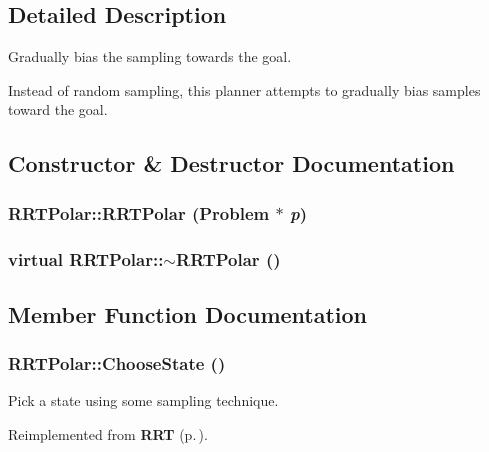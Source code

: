 \subsection{Detailed Description}
Gradually bias the sampling towards the goal.

Instead of random sampling, this planner attempts to gradually bias  samples toward the goal. 



\subsection{Constructor \& Destructor Documentation}
\subsubsection{\setlength{\rightskip}{0pt plus 5cm}RRTPolar::RRTPolar ({\bf Problem} $\ast$ {\em p})}\label{classRRTPolar_a0}


\subsubsection{\setlength{\rightskip}{0pt plus 5cm}virtual RRTPolar::$\sim$RRTPolar ()\hspace{0.3cm}{\tt  [inline, virtual]}}\label{classRRTPolar_a1}




\subsection{Member Function Documentation}
\subsubsection{ RRTPolar::Choose\-State ()\hspace{0.3cm}{\tt  [protected, virtual]}}\label{classRRTPolar_b0}


Pick a state using some sampling technique.



Reimplemented from {\bf RRT} {\rm (p.\,\pageref{classRRT_b4})}.
